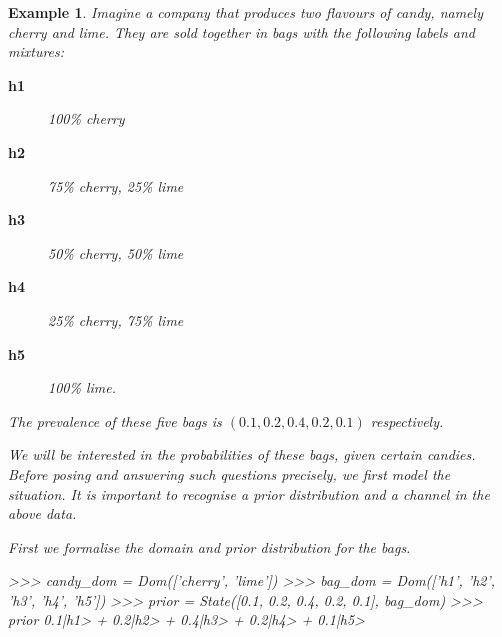 \documentclass[leqno]{tufte-book} %
\newtheorem{example}[theorem]{Example}
\begin{document}



\begin{example}
\label{ex:candy}
Imagine a company that produces two flavours of candy, namely
\textit{cherry} and \textit{lime}. They are sold together in bags
with the following labels and mixtures:
\begin{description}
\item[\textbf{h1}] 100\% cherry
\item[\textbf{h2}] 75\% cherry, 25\% lime
\item[\textbf{h3}] 50\% cherry, 50\% lime
\item[\textbf{h4}] 25\% cherry, 75\% lime
\item[\textbf{h5}] 100\% lime.
\end{description} 

\noindent The prevalence of these five bags is $(0.1, 0.2, 0.4, 0.2,
0.1)$ respectively.

We will be interested in the probabilities of these bags, given
certain candies. Before posing and answering such questions precisely,
we first model the situation. It is important to recognise a prior
distribution and a channel in the above data.

First we formalise the domain and prior distribution for the bags.
\begin{python}
>>> candy_dom = Dom(['cherry', 'lime'])
>>> bag_dom = Dom(['h1', 'h2', 'h3', 'h4', 'h5'])
>>> prior = State([0.1, 0.2, 0.4, 0.2, 0.1], bag_dom)
>>> prior
0.1|h1> + 0.2|h2> + 0.4|h3> + 0.2|h4> + 0.1|h5>
\end{python}


\end{example}
\end{document}
